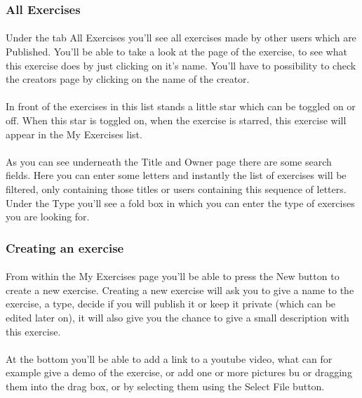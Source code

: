 \documentclass[11pt,a4paper]{scrartcl}
\begin{document}
\subsubsection{All Exercises}
\paragraph{}Under the tab All Exercises you'll see all exercises made by other users which are Published. You'll be able to take a look at the page of the exercise, to see what this exercise does by just clicking on it's name. You'll have to possibility to check the creators page by clicking on the name of the creator.
\paragraph{}In front of the exercises in this list stands a little star which can be toggled on or off. When this star is toggled on, when the exercise is starred, this exercise will appear in the My Exercises list.
\paragraph{}As you can see underneath the Title and Owner page there are some search fields. Here you can enter some letters and instantly the list of exercises will be filtered, only containing those titles or users containing this sequence of letters. Under the Type you'll see a fold box in which you can enter the type of exercises you are looking for.

\subsubsection{Creating an exercise}
\paragraph{}From within the My Exercises page you'll be able to press the New button to create a new exercise. Creating a new exercise will ask you to give a name to the exercise, a type, decide if you will publish it or keep it private (which can be edited later on), it will also give you the chance to give a small description with this exercise.
\paragraph{}At the bottom you'll be able to add a link to a youtube video, what can for example give a demo of the exercise, or add one or more pictures bu or dragging them into the drag box, or by selecting them using the Select File button. 
\end{document}
